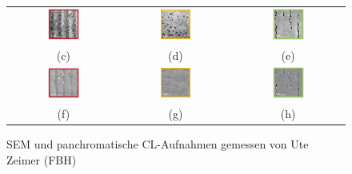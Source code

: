 \begin{figure}
\begin{tabular}{ccc}
 \includegraphics[width=0.30\textwidth]{Bilder/TS4045/aELOcl2.png} &   \includegraphics[width=0.30\textwidth]{Bilder/TS4045/bELOcl2.png} & \includegraphics[width=0.30\textwidth]{Bilder/TS4045/cELOcl2.png}  \\
(c)  & (d) & (e)   \\[6pt]
\includegraphics[width=0.30\textwidth]{Bilder/TS4045/aELOcl1.png} & \includegraphics[width=0.30\textwidth]{Bilder/TS4045/bELOcl1.png}  & \includegraphics[width=0.30\textwidth]{Bilder/TS4045/cELOcl1.png} \\
(f)  & (g) & (h)   \\[6pt]
\end{tabular}
\caption{SEM und panchromatische CL-Aufnahmen gemessen von Ute Zeimer (FBH)}
\end{figure}
\noindent 
%